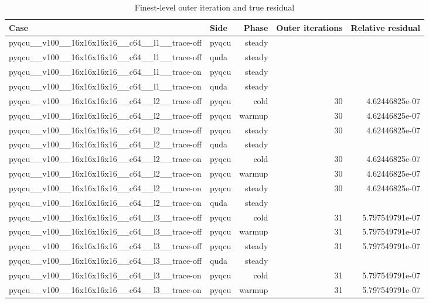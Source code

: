 \begin{table}[htbp]
\centering
\caption{Finest-level outer iteration and true residual}
\small
\begin{tabular}{@{}llrrr@{}}
\toprule
Case & Side & Phase & Outer iterations & Relative residual \\
\midrule
pyqcu\_\_v100\_\_16x16x16x16\_\_c64\_\_l1\_\_trace-off & pyqcu & steady &  &  \\
pyqcu\_\_v100\_\_16x16x16x16\_\_c64\_\_l1\_\_trace-off & quda & steady &  &  \\
pyqcu\_\_v100\_\_16x16x16x16\_\_c64\_\_l1\_\_trace-on & pyqcu & steady &  &  \\
pyqcu\_\_v100\_\_16x16x16x16\_\_c64\_\_l1\_\_trace-on & quda & steady &  &  \\
pyqcu\_\_v100\_\_16x16x16x16\_\_c64\_\_l2\_\_trace-off & pyqcu & cold & 30 & 4.62446825e-07 \\
pyqcu\_\_v100\_\_16x16x16x16\_\_c64\_\_l2\_\_trace-off & pyqcu & warmup & 30 & 4.62446825e-07 \\
pyqcu\_\_v100\_\_16x16x16x16\_\_c64\_\_l2\_\_trace-off & pyqcu & steady & 30 & 4.62446825e-07 \\
pyqcu\_\_v100\_\_16x16x16x16\_\_c64\_\_l2\_\_trace-off & quda & steady &  &  \\
pyqcu\_\_v100\_\_16x16x16x16\_\_c64\_\_l2\_\_trace-on & pyqcu & cold & 30 & 4.62446825e-07 \\
pyqcu\_\_v100\_\_16x16x16x16\_\_c64\_\_l2\_\_trace-on & pyqcu & warmup & 30 & 4.62446825e-07 \\
pyqcu\_\_v100\_\_16x16x16x16\_\_c64\_\_l2\_\_trace-on & pyqcu & steady & 30 & 4.62446825e-07 \\
pyqcu\_\_v100\_\_16x16x16x16\_\_c64\_\_l2\_\_trace-on & quda & steady &  &  \\
pyqcu\_\_v100\_\_16x16x16x16\_\_c64\_\_l3\_\_trace-off & pyqcu & cold & 31 & 5.797549791e-07 \\
pyqcu\_\_v100\_\_16x16x16x16\_\_c64\_\_l3\_\_trace-off & pyqcu & warmup & 31 & 5.797549791e-07 \\
pyqcu\_\_v100\_\_16x16x16x16\_\_c64\_\_l3\_\_trace-off & pyqcu & steady & 31 & 5.797549791e-07 \\
pyqcu\_\_v100\_\_16x16x16x16\_\_c64\_\_l3\_\_trace-off & quda & steady &  &  \\
pyqcu\_\_v100\_\_16x16x16x16\_\_c64\_\_l3\_\_trace-on & pyqcu & cold & 31 & 5.797549791e-07 \\
pyqcu\_\_v100\_\_16x16x16x16\_\_c64\_\_l3\_\_trace-on & pyqcu & warmup & 31 & 5.797549791e-07 \\

\end{tabular}
\end{table}
